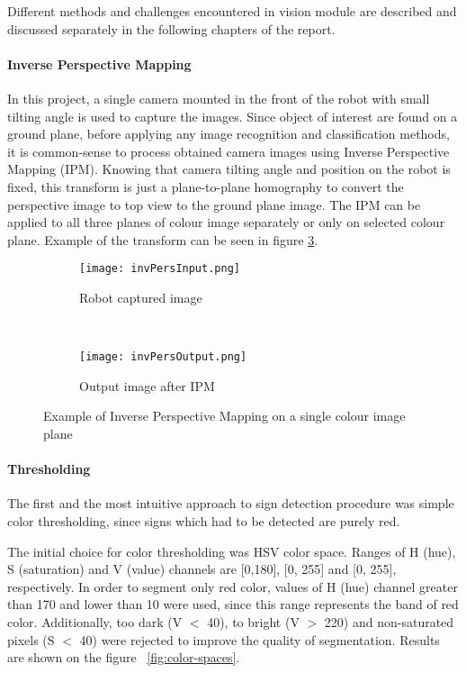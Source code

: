 Different methods and challenges encountered in vision module are described and discussed separately in the following chapters of the report.
\paragraph{Inverse Perspective Mapping}

In this project, a single camera mounted in the front of the robot with small tilting angle is used to capture the images. Since object of interest are found on a ground plane, before applying any image recognition and classification methods, it is common-sense to process obtained camera images using Inverse Perspective Mapping (IPM).
Knowing that camera tilting angle and position on the robot is fixed, this transform is just a  plane-to-plane homography to convert the perspective image to
top view to the ground plane image. The IPM can be applied to all three planes of colour image separately or only on selected colour plane. Example of the transform can be seen in figure \ref{fig:ipm_example}.
\begin{figure}[!ht]
	\centering
	\begin{subfigure}[b]{0.3\textwidth}
		\texttt{[image: invPersInput.png]}
		\caption{Robot captured image}
		\label{fig:}
	\end{subfigure}%
	~ 
	\begin{subfigure}[b]{0.3\textwidth}
		\texttt{[image: invPersOutput.png]}
		\caption{Output image after IPM}
		\label{fig:}
	\end{subfigure}
	\caption{Example of Inverse Perspective Mapping on a single colour image plane}
	\label{fig:ipm_example}
\end{figure}

\paragraph{Thresholding}

The first and the most intuitive approach to sign detection procedure was simple color thresholding, since signs which had to be detected are purely red.

The initial choice for color thresholding was HSV color space. Ranges of H (hue), S (saturation) and V (value) channels are [0,180], [0, 255] and [0, 255], respectively. In order to segment only red color, values of H (hue) channel greater than 170 and lower than 10 were used, since this range represents the band of red color. Additionally, too dark (V $ < $ 40), to bright (V $ > $ 220) and non-saturated pixels (S $ < $ 40) were rejected to improve the quality of segmentation. Results are shown on the figure ~\ref{fig:color-spaces}.

